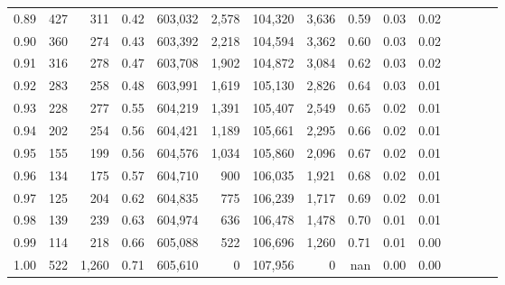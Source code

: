 \begin{tabular}{rrrcrrrrrrrrrrr}
0.89 &     427 &    311 &                                       0.42 &  603,032 &    2,578 &  104,320 &    3,636 &  0.59 &  0.03 &                         0.02 \\
0.90 &     360 &    274 &                                       0.43 &  603,392 &    2,218 &  104,594 &    3,362 &  0.60 &  0.03 &                         0.02 \\
0.91 &     316 &    278 &                                       0.47 &  603,708 &    1,902 &  104,872 &    3,084 &  0.62 &  0.03 &                         0.02 \\
0.92 &     283 &    258 &                                       0.48 &  603,991 &    1,619 &  105,130 &    2,826 &  0.64 &  0.03 &                         0.01 \\
0.93 &     228 &    277 &                                       0.55 &  604,219 &    1,391 &  105,407 &    2,549 &  0.65 &  0.02 &                         0.01 \\
0.94 &     202 &    254 &                                       0.56 &  604,421 &    1,189 &  105,661 &    2,295 &  0.66 &  0.02 &                         0.01 \\
0.95 &     155 &    199 &                                       0.56 &  604,576 &    1,034 &  105,860 &    2,096 &  0.67 &  0.02 &                         0.01 \\
0.96 &     134 &    175 &                                       0.57 &  604,710 &      900 &  106,035 &    1,921 &  0.68 &  0.02 &                         0.01 \\
0.97 &     125 &    204 &                                       0.62 &  604,835 &      775 &  106,239 &    1,717 &  0.69 &  0.02 &                         0.01 \\
0.98 &     139 &    239 &                                       0.63 &  604,974 &      636 &  106,478 &    1,478 &  0.70 &  0.01 &                         0.01 \\
0.99 &     114 &    218 &                                       0.66 &  605,088 &      522 &  106,696 &    1,260 &  0.71 &  0.01 &                         0.00 \\
1.00 &     522 &  1,260 &                                       0.71 &  605,610 &        0 &  107,956 &        0 &   nan &  0.00 &                         0.00 \\
\bottomrule
\end{tabular}
